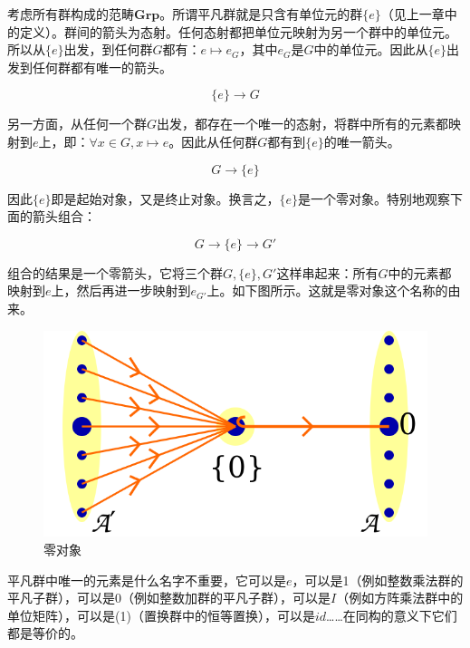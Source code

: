 \documentclass[b5paper]{ctexart}
\begin{document}
\begin{example}
考虑所有群构成的范畴$\pmb{Grp}$。所谓平凡群就是只含有单位元的群$\{e\}$（见上一章中的定义）。群间的箭头为态射。任何态射都把单位元映射为另一个群中的单位元。所以从$\{e\}$出发，到任何群$G$都有：$e \mapsto e_G$，其中$e_G$是$G$中的单位元。因此从$\{e\}$出发到任何群都有唯一的箭头。

\[
\{e\} \longrightarrow G
\]

另一方面，从任何一个群$G$出发，都存在一个唯一的态射，将群中所有的元素都映射到$e$上，即：$\forall x \in G, x \mapsto e$。因此从任何群$G$都有到$\{e\}$的唯一箭头。

\[
G \longrightarrow \{e\}
\]

因此$\{e\}$即是起始对象，又是终止对象。换言之，$\{e\}$是一个零对象。特别地观察下面的箭头组合：

\[
  G \longrightarrow \{e\} \longrightarrow G'
\]

组合的结果是一个零箭头，它将三个群$G, \{e\}, G'$这样串起来：所有$G$中的元素都映射到$e$上，然后再进一步映射到$e_{G'}$上。如下图所示。这就是零对象这个名称的由来。

\begin{figure}[htbp]
 \centering
 \includegraphics[scale=0.3]{img/01-obj.png}
 \caption{零对象}
 \label{fig:zero-obj}
\end{figure}

平凡群中唯一的元素是什么名字不重要，它可以是$e$，可以是1（例如整数乘法群的平凡子群），可以是0（例如整数加群的平凡子群），可以是$I$（例如方阵乘法群中的单位矩阵），可以是(1)（置换群中的恒等置换），可以是$id$……在同构的意义下它们都是等价的。
\end{example}
\end{document}

